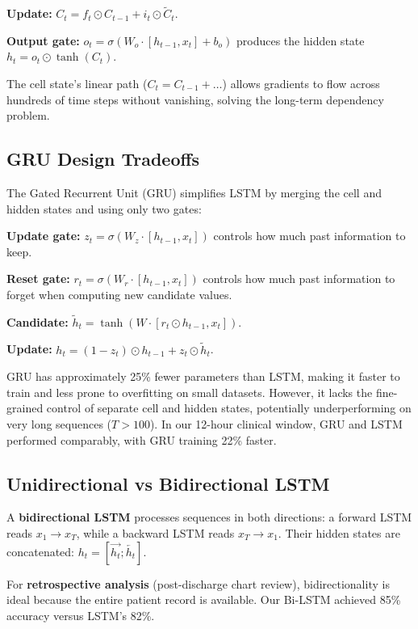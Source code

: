 \documentclass[11pt,a4paper]{article}
\begin{document}
\textbf{Update:} $C_t = f_t \odot C_{t-1} + i_t \odot \tilde{C}_t$.

\textbf{Output gate:} $o_t = \sigma(W_o \cdot [h_{t-1}, x_t] + b_o)$ produces the hidden state $h_t = o_t \odot \tanh(C_t)$.

The cell state's linear path ($C_t = C_{t-1} + \dots$) allows gradients to flow across hundreds of time steps without vanishing, solving the long-term dependency problem.

\subsection{GRU Design Tradeoffs}

The Gated Recurrent Unit (GRU) simplifies LSTM by merging the cell and hidden states and using only two gates:

\textbf{Update gate:} $z_t = \sigma(W_z \cdot [h_{t-1}, x_t])$ controls how much past information to keep.

\textbf{Reset gate:} $r_t = \sigma(W_r \cdot [h_{t-1}, x_t])$ controls how much past information to forget when computing new candidate values.

\textbf{Candidate:} $\tilde{h}_t = \tanh(W \cdot [r_t \odot h_{t-1}, x_t])$.

\textbf{Update:} $h_t = (1-z_t) \odot h_{t-1} + z_t \odot \tilde{h}_t$.

GRU has approximately 25\% fewer parameters than LSTM, making it faster to train and less prone to overfitting on small datasets. However, it lacks the fine-grained control of separate cell and hidden states, potentially underperforming on very long sequences ($T > 100$). In our 12-hour clinical window, GRU and LSTM performed comparably, with GRU training 22\% faster.

\subsection{Unidirectional vs Bidirectional LSTM}

A \textbf{bidirectional LSTM} processes sequences in both directions: a forward LSTM reads $x_1 \to x_T$, while a backward LSTM reads $x_T \to x_1$. Their hidden states are concatenated: $h_t = [\overrightarrow{h_t}; \overleftarrow{h_t}]$.

For \textbf{retrospective analysis} (post-discharge chart review), bidirectionality is ideal because the entire patient record is available. Our Bi-LSTM achieved 85\% accuracy versus LSTM's 82\%.
\end{document}
